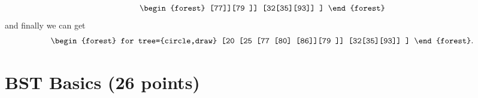 \documentclass[11pt]{exam}
\begin{document}
\begin{enumerate}[a)]
\begin{solution}
\[\begin{forest}
                                          [77]][79 ]]
                          [32[35][93]]
                      ]
                  \end{forest} \]
              and finally we can get  \[
                  \begin{forest}
                      for tree={circle,draw}
                      [20
                          [25
                                  [77
                                          [80]
                                          [86]][79 ]]
                          [32[35][93]]
                      ]
                  \end{forest}.  \]
          \end{solution}

\end{enumerate}

\section{BST Basics (26 points)}
\end{document}
